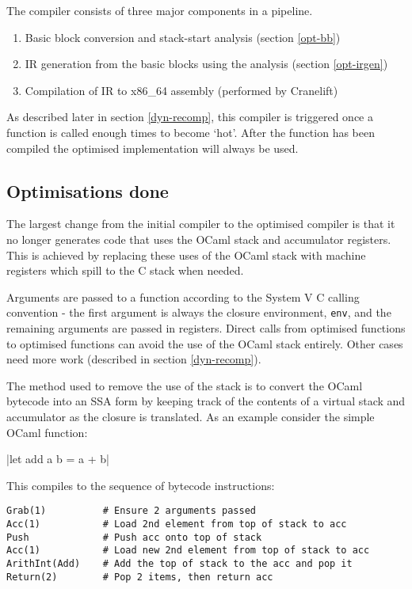 The compiler consists of three major components in a pipeline.

\begin{enumerate}
      \item Basic block conversion and stack-start analysis (section \ref{opt-bb})
      \item IR generation from the basic blocks using the analysis (section \ref{opt-irgen})
      \item Compilation of IR to x86\_64 assembly (performed by Cranelift)
\end{enumerate}

As described later in section \ref{dyn-recomp}, this compiler is triggered once a function is
called enough times to become `hot'. After the function has been compiled the optimised
implementation
will always be used.

\subsection{Optimisations done}

The largest change from the initial compiler to the optimised compiler is that it no longer
generates
code that uses the OCaml stack and accumulator registers. This is achieved by replacing these uses
of the OCaml stack with machine registers which spill to the C stack when needed.

Arguments are passed to a function according to the System V C calling convention - the first
argument is always the closure environment, \texttt{env}, and the remaining arguments are passed
in registers. Direct calls from optimised functions to optimised functions can avoid the use of
the OCaml stack entirely. Other cases need more work (described in section \ref{dyn-recomp}).

The method used to remove the use of the stack is to convert the OCaml bytecode into an SSA form
by keeping track of the contents of a virtual stack and accumulator as the closure is translated.
As an example consider the simple OCaml function:

|let add a b = a + b|

This compiles to the sequence of bytecode instructions:

\begin{verbatim}
Grab(1)          # Ensure 2 arguments passed
Acc(1)           # Load 2nd element from top of stack to acc
Push             # Push acc onto top of stack
Acc(1)           # Load new 2nd element from top of stack to acc
ArithInt(Add)    # Add the top of stack to the acc and pop it
Return(2)        # Pop 2 items, then return acc
\end{verbatim}

